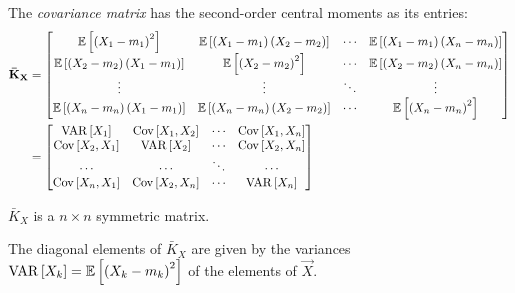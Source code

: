 		\begin{definition} \label{def:Covariance Matrix}
			The \emph{covariance matrix} has the second-order central moments as its entries:
			\begin{equation} \label{eq:Covariance Matrix}
				\begin{aligned}
				\mathbf{\bar{K}_{X}}
				&= \begin{bmatrix}
					\operatorname{\operatorname{\mathbb{E}}} \left[ \left( X_{1} - m_{1} \right)^{2} \right] & \operatorname{\operatorname{\mathbb{E}}} \left[ \left( X_{1}-m_{1} \right) \left( X_{2}-m_{2} \right) \right] & \cdots & \operatorname{\operatorname{\mathbb{E}}} \left[ \left( X_{1}-m_{1} \right) \left( X_{n}-m_{n} \right) \right] \\
					\operatorname{\operatorname{\mathbb{E}}} \left[ \left( X_{2}-m_{2} \right) \left( X_{1}-m_{1} \right) \right] & \operatorname{\operatorname{\mathbb{E}}} \left[ \left( X_{2}-m_{2} \right)^{2} \right] & \cdots & \operatorname{\operatorname{\mathbb{E}}} \left[ \left( X_{2}-m_{2} \right) \left( X_{n}-m_{n} \right) \right] \\
					\vdots & \vdots & \ddots & \vdots \\
					\operatorname{\operatorname{\mathbb{E}}} \left[ \left( X_{n}-m_{n} \right) \left( X_{1}-m_{1} \right) \right] & \operatorname{\operatorname{\mathbb{E}}} \left[ \left( X_{n}-m_{n} \right) \left( X_{2}-m_{2} \right) \right] & \cdots & \operatorname{\operatorname{\mathbb{E}}} \left[ \left( X_{n}-m_{n} \right)^{2} \right] \\
				\end{bmatrix} \\
				&= \begin{bmatrix}
				\operatorname{\operatorname{VAR}} \left[ X_{1} \right] & \operatorname{\operatorname{Cov}} \left[X_{1},X_{2} \right] & \cdots & \operatorname{\operatorname{Cov}} \left[ X_{1},X_{n} \right] \\
				\operatorname{\operatorname{Cov}} \left[ X_{2},X_{1} \right] & \operatorname{\operatorname{VAR}} \left[ X_{2} \right]  & \cdots & \operatorname{\operatorname{Cov}} \left[ X_{2},X_{n} \right] \\
				\cdots & \cdots & \ddots & \cdots \\
				\operatorname{\operatorname{Cov}} \left[ X_{n},X_{1} \right] & \operatorname{\operatorname{Cov}} \left[ X_{2},X_{n} \right] & \cdots & \operatorname{\operatorname{VAR}} \left[ X_{n} \right] \\
				\end{bmatrix}
				\end{aligned}
			\end{equation}
			\begin{remark}
				$\bar{K}_{X}$ is a $n \times n$ symmetric matrix.
			\end{remark}
			\begin{remark}
				The diagonal elements of $\bar{K}_{X}$ are given by the variances $\operatorname{\operatorname{VAR}} \left[ X_{k} \right] = \operatorname{\operatorname{\mathbb{E}}} \left[ \left( X_{k}-m_{k} \right)^{2} \right]$ of the elements of $\vec{X}$.

\end{remark}
\end{definition}
